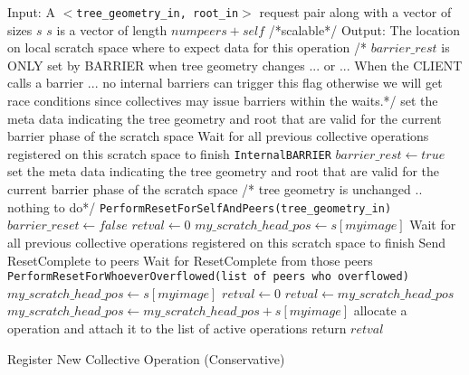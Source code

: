 \documentclass[times,10pt]{article}
\begin{document}
\begin{algorithm}[h]
\begin{algorithmic}[1]
\STATE Input: A $<$\texttt{tree\_geometry\_in, root\_in}$>$ request pair along with a vector of sizes $s$ 
\STATE $s$ is a vector of length $numpeers+self$ /*scalable*/
\STATE Output: The location on local scratch space where to expect data for this operation
\STATE /* $barrier\_rest$ is ONLY set by BARRIER when tree geometry changes ... or ... When the CLIENT calls a barrier ... no internal barriers can trigger this flag otherwise we will get race conditions since collectives may issue barriers within the waits.*/
\STATE set the meta data indicating the tree geometry and root that are valid for the current barrier phase of the scratch space 
\STATE Wait for all previous collective operations registered on this scratch space to finish
\STATE \texttt{InternalBARRIER}
\STATE $barrier\_rest \leftarrow true$ 
\STATE set the meta data indicating the tree geometry and root that are valid for the current barrier phase of the scratch space 
\ELSE
\STATE /* tree geometry is unchanged .. nothing to do*/
\ENDIF
{}
\STATE \texttt{PerformResetForSelfAndPeers(tree\_geometry\_in)}
\STATE $barrier\_reset \leftarrow false$
\STATE $retval \leftarrow 0$
\STATE $my\_scratch\_head\_pos \leftarrow s[myimage]$
\STATE Wait for all previous collective operations registered on this scratch space to finish
\STATE Send ResetComplete to peers
\ENDIF
{}
\STATE Wait for ResetComplete from those peers
\ENDIF
\STATE \texttt{PerformResetForWhoeverOverflowed(list of peers who overflowed)}
\STATE $my\_scratch\_head\_pos \leftarrow s[myimage]$
\STATE  $retval \leftarrow 0$
\ELSE
\STATE $retval \leftarrow my\_scratch\_head\_pos$
\STATE $my\_scratch\_head\_pos \leftarrow my\_scratch\_head\_pos + s[myimage]$
\ENDIF
\STATE allocate a operation and attach it to the list of active operations
\STATE return $retval$

\end{algorithmic}
\caption{Register New Collective Operation (Conservative) }
\label{registerscratchop}
\end{algorithm}%
\end{document}
